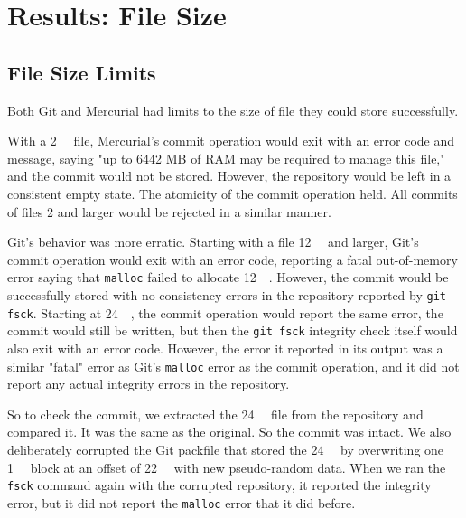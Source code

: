 
\cleardoublepage

\section{Results: File Size}
\label{file-size-results}

\subsection{File Size Limits}
\label{file-size-limits-results}

Both Git and Mercurial had limits to the size of file they could store
successfully.

With a \SI{2}{\gibi\byte} file, Mercurial's \gls{commit} operation would exit
with an error code and message, saying "up to 6442 MB of RAM may be required to
manage this file," and the \gls{commit} would not be stored. However, the
\gls{repository} would be left in a consistent empty state. The atomicity of the
\gls{commit} operation held. All commits of files \SI{2}{\gib} and larger would
be rejected in a similar manner.

Git's behavior was more erratic. Starting with a file \SI{12}{\gibi\byte} and
larger, Git's \gls{commit} operation would exit with an error code, reporting a
fatal out-of-memory error saying that
\lstinline{malloc}
failed to allocate \SI{12}{\gibi\byte}.
However, the \gls{commit} would be successfully stored with no consistency
errors in the \gls{repository} reported by
\lstinline{git fsck}.
Starting at \SI{24}{\gibi\byte}, the \gls{commit} operation would report the
same error, the \gls{commit} would still be written, but then the
\lstinline{git fsck}
integrity check itself would also exit with an error code.
However, the error it reported in its output was a similar "fatal" error as
Git's
\lstinline{malloc}
error as the \gls{commit} operation, and it did not report any actual integrity
errors in the \gls{repository}.

So to check the \gls{commit}, we extracted the \SI{24}{\gibi\byte} file from the
\gls{repository} and compared it. It was the same as the original. So the
\gls{commit} was intact. We also deliberately corrupted the Git \gls{packfile}
that stored the \SI{24}{\gibi\byte} by overwriting one \SI{1}{\mebi\byte} block
at an offset of \SI{22}{\gibi\byte} with new pseudo-random data. When we ran the
\lstinline{fsck} command again with the corrupted \gls{repository}, it reported the
integrity error, but it did not report the \lstinline{malloc} error that it did
before.

